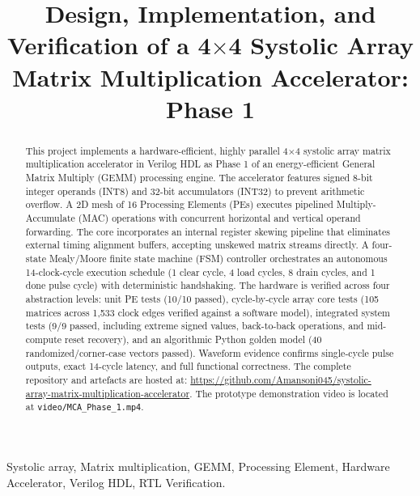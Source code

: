 \documentclass[conference]{IEEEtran}
\begin{document}
\title{Design, Implementation, and Verification of a 4$\times$4 Systolic Array Matrix Multiplication Accelerator: Phase 1}

\author{
}

\maketitle

\begin{abstract}
This project implements a hardware-efficient, highly parallel 4$\times$4 systolic array matrix multiplication accelerator in Verilog HDL as Phase 1 of an energy-efficient General Matrix Multiply (GEMM) processing engine. The accelerator features signed 8-bit integer operands (INT8) and 32-bit accumulators (INT32) to prevent arithmetic overflow. A 2D mesh of 16 Processing Elements (PEs) executes pipelined Multiply-Accumulate (MAC) operations with concurrent horizontal and vertical operand forwarding. The core incorporates an internal register skewing pipeline that eliminates external timing alignment buffers, accepting unskewed matrix streams directly. A four-state Mealy/Moore finite state machine (FSM) controller orchestrates an autonomous 14-clock-cycle execution schedule (1 clear cycle, 4 load cycles, 8 drain cycles, and 1 done pulse cycle) with deterministic handshaking. The hardware is verified across four abstraction levels: unit PE tests (10/10 passed), cycle-by-cycle array core tests (105 matrices across 1,533 clock edges verified against a software model), integrated system tests (9/9 passed, including extreme signed values, back-to-back operations, and mid-compute reset recovery), and an algorithmic Python golden model (40 randomized/corner-case vectors passed). Waveform evidence confirms single-cycle pulse outputs, exact 14-cycle latency, and full functional correctness. The complete repository and artefacts are hosted at: \url{https://github.com/Amansoni045/systolic-array-matrix-multiplication-accelerator}. The prototype demonstration video is located at \texttt{video/MCA\_Phase\_1.mp4}.
\end{abstract}

\begin{IEEEkeywords}
Systolic array, Matrix multiplication, GEMM, Processing Element, Hardware Accelerator, Verilog HDL, RTL Verification.
\end{IEEEkeywords}
\end{document}
